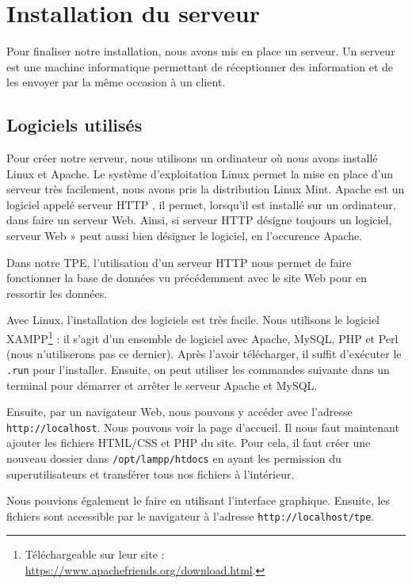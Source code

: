 \chapter{Installation du serveur}

Pour finaliser notre installation, nous avons mis en place un serveur. Un serveur est une machine informatique permettant de réceptionner des information et de les envoyer par la même occasion à un client.

\section{Logiciels utilisés}

Pour créer notre serveur, nous utilisons un ordinateur où nous avons installé Linux et Apache. Le système d'exploitation Linux permet la mise en place d'un serveur très facilement, nous avons pris la distribution Linux Mint. Apache est un logiciel appelé \og serveur HTTP \fg, il permet, lorsqu'il est installé sur un ordinateur, dans faire un serveur Web. Ainsi, si \og serveur HTTP \fg désigne toujours un logiciel, \og serveur Web » peut aussi bien désigner le logiciel, en l'occurence Apache.

Dans notre TPE, l'utilisation d'un serveur HTTP nous permet de faire fonctionner la base de données vu précédemment avec le site Web pour en ressortir les données.

\Espace

Avec Linux, l'installation des logiciels est très facile. Nous utilisons le logiciel XAMPP\footnote{Téléchargeable sur leur site : \url{https://www.apachefriends.org/download.html}.} : il s'agit d'un ensemble de logiciel avec Apache, MySQL, PHP et Perl (nous n'utiliserons pas ce dernier). Après l'avoir télécharger, il suffit d'exécuter le \verb-.run- pour l'installer. Ensuite, on peut utiliser les commandes suivante dans un terminal pour démarrer et arrêter le serveur Apache et MySQL.


Ensuite, par un navigateur Web, nous pouvons y accéder avec l'adresse \verb-http://localhost-. Nous pouvons voir la page d'accueil. Il nous faut maintenant ajouter les fichiers HTML/CSS et PHP du site. Pour cela, il faut créer une nouveau dossier dans \verb-/opt/lampp/htdocs- en ayant les permission du superutilisateurs et transférer tous nos fichiers à l'intérieur.


Nous pouvions également le faire en utilisant l'interface graphique. Ensuite, les fichiers sont accessible par le navigateur à l'adresse \verb-http://localhost/tpe-.

